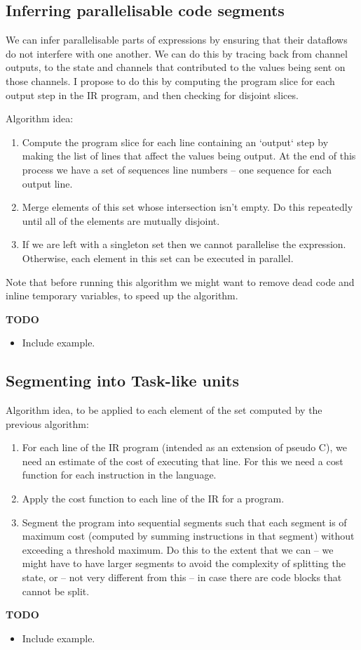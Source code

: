 \documentclass{article}
\newenvironment{todo}{\begin{mdframed}[backgroundcolor=gray!20]\bf TODO \begin{itemize}}{\end{itemize}\end{mdframed}}
\begin{document}
\subsection{Inferring parallelisable code segments}
We can infer parallelisable parts of expressions by ensuring that their
dataflows do not interfere with one another. We can do this by tracing back from
channel outputs, to the state and channels that contributed to the values being
sent on those channels. I propose to do this by computing the program slice for
each output step in the IR program, and then checking for disjoint slices.

Algorithm idea:
\begin{enumerate}
  \item Compute the program slice for each line containing an `output` step by
    making the list of lines that affect the values being output. At the end of
    this process we have a set of sequences line numbers -- one sequence for
    each output line.
  \item Merge elements of this set whose intersection isn't empty. Do this
    repeatedly until all of the elements are mutually disjoint.
  \item If we are left with a singleton set then we cannot parallelise the
    expression. Otherwise, each element in this set can be executed in parallel.
\end{enumerate}
Note that before running this algorithm we might want to remove dead code and
inline temporary variables, to speed up the algorithm.

\begin{todo}
\item Include example.
\end{todo}

\subsection{Segmenting into Task-like units}
Algorithm idea, to be applied to each element of the set computed by the
previous algorithm:
\begin{enumerate}
  \item For each line of the IR program (intended as an extension of pseudo C),
    we need an estimate of the cost of executing that line. For this we need a
    cost function for each instruction in the language.
  \item Apply the cost function to each line of the IR for a program.
  \item Segment the program into sequential segments such that each segment is
    of maximum cost (computed by summing instructions in that segment) without
    exceeding a threshold maximum. Do this to the extent that we can -- we might
    have to have larger segments to avoid the complexity of splitting the state,
    or -- not very different from this -- in case there are code blocks that
    cannot be split.
\end{enumerate}

\begin{todo}
\item Include example.
\end{todo}
\end{document}
